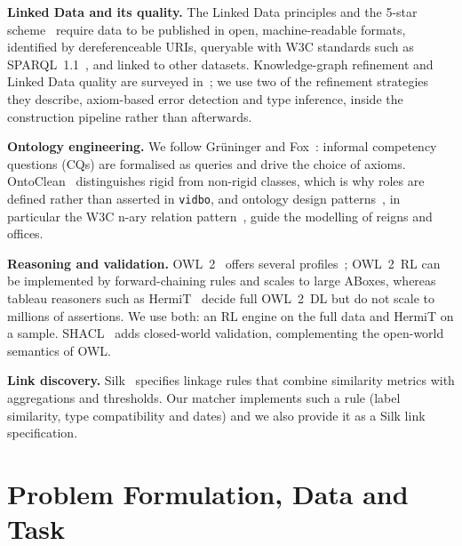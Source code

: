 \documentclass{article}
\newcommand{\ttl}[1]{\texttt{#1}}          %
\newcommand{\vidbo}{\ttl{vidbo}}
\begin{document}
\textbf{Linked Data and its quality.} The Linked Data principles and the 5-star scheme~\cite{bernerslee2006linked}
require data to be published in open, machine-readable formats, identified by dereferenceable URIs, queryable with W3C
standards such as SPARQL~1.1~\cite{sparql11}, and linked to other datasets. Knowledge-graph refinement and Linked Data
quality are surveyed in~\cite{paulheim2017refinement,zaveri2016quality}; we use two of the refinement strategies they
describe, axiom-based error detection and type inference, inside the construction pipeline rather than afterwards.

\textbf{Ontology engineering.} We follow Grüninger and Fox~\cite{gruninger1995methodology}: informal competency
questions (CQs) are formalised as queries and drive the choice of axioms. OntoClean~\cite{guarino2002ontoclean}
distinguishes rigid from non-rigid classes, which is why roles are defined rather than asserted in \vidbo, and
ontology design patterns~\cite{gangemi2005odp}, in particular the W3C n-ary relation pattern~\cite{noy2006nary},
guide the modelling of reigns and offices.

\textbf{Reasoning and validation.} OWL~2~\cite{owl2overview} offers several profiles~\cite{owl2profiles}; OWL~2~RL can
be implemented by forward-chaining rules and scales to large ABoxes, whereas tableau reasoners such as
HermiT~\cite{glimm2014hermit} decide full OWL~2~DL but do not scale to millions of assertions. We use both: an RL
engine on the full data and HermiT on a sample. SHACL~\cite{shacl2017} adds closed-world validation, complementing the
open-world semantics of OWL.

\textbf{Link discovery.} Silk~\cite{volz2009silk} specifies linkage rules that combine similarity metrics with
aggregations and thresholds. Our matcher implements such a rule (label similarity, type compatibility and dates) and
we also provide it as a Silk link specification.

\section{Problem Formulation, Data and Task}\label{sec:problem}
\end{document}
